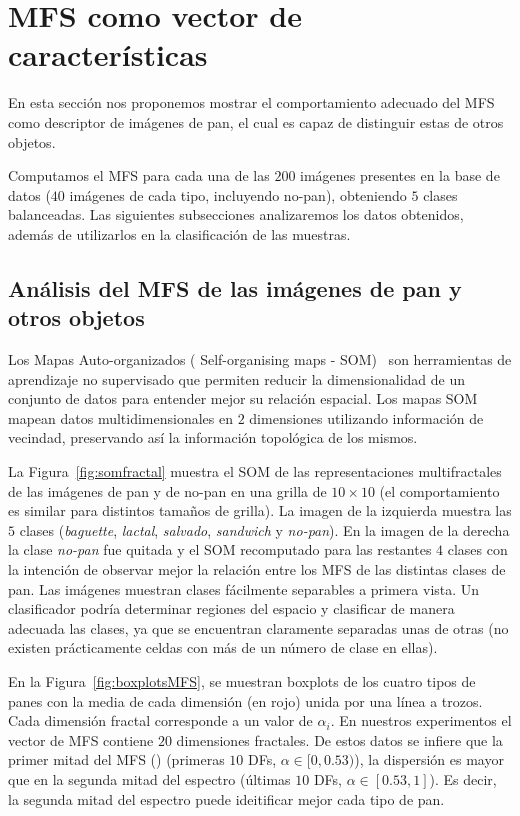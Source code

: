 \section{MFS como vector de caracter\'isticas}

En esta sección nos proponemos mostrar el comportamiento adecuado del MFS como descriptor de imágenes de pan, el cual es capaz de distinguir estas de otros objetos.

Computamos el MFS para cada una de las $200$ imágenes presentes en la base de datos ($40$ imágenes de cada tipo, incluyendo no-pan), obteniendo $5$ clases balanceadas.  Las siguientes subsecciones analizaremos los datos obtenidos, además de utilizarlos en la clasificación de las muestras.

\subsection{Análisis del MFS de las imágenes de pan y otros objetos}

Los Mapas Auto-organizados ( Self-organising maps -  SOM)~\cite{Kohonen2001} son herramientas de aprendizaje no supervisado que permiten reducir la dimensionalidad de un conjunto de datos para entender mejor su relación espacial. Los mapas SOM mapean datos multidimensionales en $2$ dimensiones utilizando información de vecindad, preservando así la información topológica de los mismos.

La Figura~\ref{fig:somfractal} muestra el  SOM de las representaciones multifractales de las imágenes de pan y de no-pan en una grilla de $10\times 10$ (el comportamiento es similar para distintos tamaños de grilla). La imagen de la izquierda muestra las $5$ clases ({\em baguette}, {\em lactal}, {\em salvado}, {\em sandwich} y {\em no-pan}). En la imagen de la derecha la clase {\em no-pan} fue quitada y el SOM recomputado para las restantes $4$ clases con la intención de observar mejor la relación entre los MFS de las distintas clases de pan. Las imágenes muestran clases fácilmente separables a primera vista. Un clasificador podría determinar regiones del espacio y clasificar de manera adecuada las clases, ya que se encuentran claramente separadas unas de otras (no existen prácticamente celdas con más de un número de clase en ellas).

En la Figura~\ref{fig:boxplotsMFS}, se muestran boxplots de los cuatro tipos de panes con la media de cada dimensión (en rojo) unida por una línea a trozos. Cada dimensión fractal corresponde a un valor de $\alpha_{i}$. En nuestros experimentos el vector de MFS contiene $20$ dimensiones fractales. De estos datos se infiere que la primer mitad del MFS () (primeras $10$ DFs, $\alpha \in [0,0.53)$), la dispersión es mayor que en la segunda mitad del espectro  (últimas $10$ DFs, $\alpha \in [0.53,1]$). Es decir, la segunda mitad del espectro puede ideitificar mejor cada tipo de pan.

